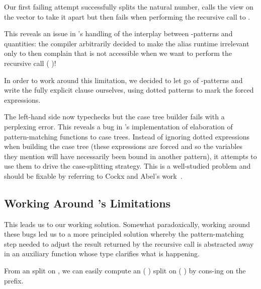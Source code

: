 Our first failing attempt successfully splits the natural number, calls the
view on the vector  to take it apart but then fails when
performing the recursive call to .


This reveals an issue in \idris{}'s handling of the interplay between
-patterns and quantities: the compiler arbitrarily decided
to make the alias  runtime irrelevant only to then complain
that  is not accessible when we want to perform the recursive
call (  )!


In order to work around this limitation, we decided to let go of
-patterns and write the fully explicit clause ourselves,
using dotted patterns to mark the forced expressions.


The left-hand side now typechecks but the case tree builder fails with a
perplexing error.
%
This reveals a bug in \idris{}'s implementation of elaboration of
pattern-matching functions to case trees.
%
Instead of ignoring dotted expressions when building the case tree (these
expressions are forced and so the variables they mention will have necessarily
been bound in another pattern), it attempts to use them to drive the case-splitting
strategy.
%
This is a well-studied problem and should be fixable by referring to
Cockx and Abel's work~\cite{DBLP:journals/jfp/CockxA20}.

\subsection{Working Around \idris{}'s Limitations}

This leads us to our working solution.
%
Somewhat paradoxically, working around these \idris{} bugs led us to a more
principled solution whereby the pattern-matching step needed to adjust the
result returned by the recursive call is abstracted away in an auxiliary
function whose type clarifies what is happening.

From an  split on , we can easily compute an
( ) split on ( \IdrisFunction{::} )
by cons-ing  on the prefix.


